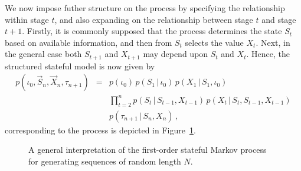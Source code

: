 \documentclass[a4paper]{article}
\begin{document}
We now impose futher structure on the process by specifying the relationship within stage $t$,
and also expanding on the relationship between stage $t$ and stage $t+1$.
Firstly, it is commonly supposed that the process determines the state $S_t$ based on available information,
and then from $S_t$ selects the value $X_t$.
Next, in the general case both $S_{t+1}$ and $X_{t+1}$ may depend upon $S_t$ and $X_t$. 
Hence, the structured stateful model is now given by
\begin{eqnarray}
p(\iota_0,\vec{S}_n,\vec{X}_n,\tau_{n+1}) & = & 
p(\iota_0)\,p(S_1\,|\,\iota_0)\,p(X_1\,|\,S_1,\iota_0)
\nonumber\\&&
\prod_{t=2}^{n}p(S_t\,|\,S_{t-1},X_{t-1})
\,p(X_t\,|\,S_t,S_{t-1},X_{t-1})
\nonumber\\&&
p(\tau_{n+1}\,|\,S_n,X_n)
\,,
\end{eqnarray}
corresponding to the process is depicted in Figure~\ref{fig:gen-stateful-1-process}.
\begin{figure}[hbt]
\centering
{}
\caption{A general interpretation of the first-order stateful Markov process for generating sequences of random length $N$.}
\label{fig:gen-stateful-1-process}
\end{figure}
\end{document}
